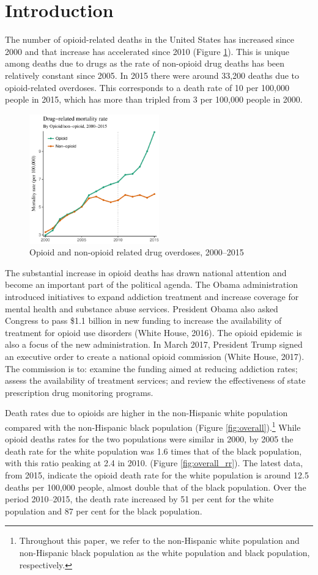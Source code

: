 \documentclass[12pt, a4paper]{article}
\begin{document}
\section{Introduction}
The number of opioid-related deaths in the United States has increased since 2000 and that increase has accelerated since 2010 (Figure \ref{fig:nood}). This is unique among deaths due to drugs as the rate of non-opioid drug deaths has been relatively constant since 2005. In 2015 there were around 33,200 deaths due to opioid-related overdoses. This corresponds to a death rate of 10 per 100,000 people in 2015, which has more than tripled from 3 per 100,000 people in 2000. 
\begin{figure}[h!]
 \centering
\includegraphics[width=0.5\textwidth]{./plots/paper_fig1_nood_v.pdf} 
 \caption{Opioid and non-opioid related drug overdoses, 2000--2015}
 \label{fig:nood}
\end{figure}

The substantial increase in opioid deaths has drawn national attention and become an important part of the political agenda. The Obama administration introduced initiatives to expand addiction treatment and increase coverage for mental health and substance abuse services. President Obama also asked Congress to pass \$1.1 billion in new funding to increase the availability of treatment for opioid use disorders (White House, 2016). The opioid epidemic is also a focus of the new administration. In March 2017, President Trump signed an executive order to create a national opioid commission (White House, 2017). The commission is to: examine the funding aimed at reducing addiction rates; assess the availability of treatment services; and review the effectiveness of state prescription drug monitoring programs. 

Death rates due to opioids are higher in the non-Hispanic white population compared with the non-Hispanic black population (Figure \ref{fig:overall}).\footnote{Throughout this paper, we refer to the non-Hispanic white population and non-Hispanic black population as the white population and black population, respectively.} While opioid deaths rates for the two populations were similar in 2000, by 2005 the death rate for the white population was 1.6 times that of the black population, with this ratio peaking at 2.4 in 2010. (Figure \ref{fig:overall_rr}). The latest data, from 2015, indicate the opioid death rate for the white population is around 12.5 deaths per 100,000 people, almost double that of the black population. Over the period 2010--2015, the death rate increased by 51 per cent for the white population and 87 per cent for the black population. 
\end{document}
